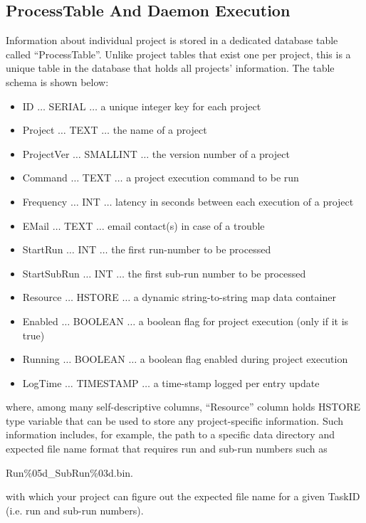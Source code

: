 \subsection{ProcessTable And Daemon Execution}
\label{pubs:model:daemon}
Information about individual project is stored in a dedicated database
table called ``ProcessTable''. Unlike project tables that exist one per
project, this is a unique table in the database that holds all projects'
information. The table schema is shown below:
\begin{itemize}
  \item ID $\ldots$ SERIAL $\ldots$ a unique integer key for each project
  \item Project $\ldots$ TEXT $\ldots$ the name of a project
  \item ProjectVer $\ldots$ SMALLINT $\dots$ the version number of a project
  \item Command $\ldots$ TEXT $\ldots$ a project execution command to be run
  \item Frequency $\ldots$ INT $\ldots$ latency in seconds between each execution of a project
  \item EMail $\ldots$ TEXT $\ldots$ email contact(s) in case of a trouble
  \item StartRun $\ldots$ INT $\ldots$ the first run-number to be processed
  \item StartSubRun $\ldots$ INT $\ldots$ the first sub-run number to be processed
  \item Resource $\ldots$ HSTORE $\ldots$ a dynamic string-to-string map data container
  \item Enabled $\ldots$ BOOLEAN $\ldots$ a boolean flag for project execution (only if it is true)
  \item Running $\ldots$ BOOLEAN $\ldots$ a boolean flag enabled during project execution
  \item LogTime $\ldots$ TIMESTAMP $\ldots$ a time-stamp logged per entry update
\end{itemize}
where, among many self-descriptive columns, ``Resource'' column holds HSTORE
type variable that can be used to store any project-specific information.
Such information includes, for example, the path to a specific data directory
and expected file name format that requires run and sub-run numbers such as
\begin{center}
 {\ttfamily Run\%05d\_SubRun\%03d.bin}.
\end{center}
with which your project can figure out the expected file name for a given
TaskID (i.e. run and sub-run numbers). 

